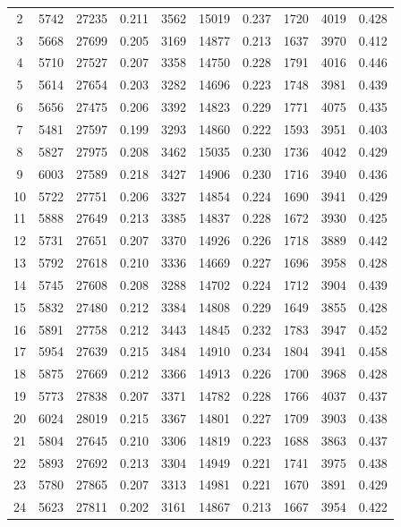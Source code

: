 \begin{table}
\begin{tabular}{c|C{1cm}C{1cm}C{1cm}|C{1cm}C{1cm}C{1cm}|C{1cm}C{1cm}C{1cm}}
 2 & 5742 & 27235 & 0.211 & 3562 & 15019 & 0.237 & 1720 & 4019 & 0.428 \\
 3 & 5668 & 27699 & 0.205 & 3169 & 14877 & 0.213 & 1637 & 3970 & 0.412 \\
 4 & 5710 & 27527 & 0.207 & 3358 & 14750 & 0.228 & 1791 & 4016 & 0.446 \\
 5 & 5614 & 27654 & 0.203 & 3282 & 14696 & 0.223 & 1748 & 3981 & 0.439 \\
 6 & 5656 & 27475 & 0.206 & 3392 & 14823 & 0.229 & 1771 & 4075 & 0.435 \\
 7 & 5481 & 27597 & 0.199 & 3293 & 14860 & 0.222 & 1593 & 3951 & 0.403 \\
 8 & 5827 & 27975 & 0.208 & 3462 & 15035 & 0.230 & 1736 & 4042 & 0.429 \\
 9 & 6003 & 27589 & 0.218 & 3427 & 14906 & 0.230 & 1716 & 3940 & 0.436 \\
10 & 5722 & 27751 & 0.206 & 3327 & 14854 & 0.224 & 1690 & 3941 & 0.429 \\
11 & 5888 & 27649 & 0.213 & 3385 & 14837 & 0.228 & 1672 & 3930 & 0.425 \\
12 & 5731 & 27651 & 0.207 & 3370 & 14926 & 0.226 & 1718 & 3889 & 0.442 \\
13 & 5792 & 27618 & 0.210 & 3336 & 14669 & 0.227 & 1696 & 3958 & 0.428 \\
14 & 5745 & 27608 & 0.208 & 3288 & 14702 & 0.224 & 1712 & 3904 & 0.439 \\
15 & 5832 & 27480 & 0.212 & 3384 & 14808 & 0.229 & 1649 & 3855 & 0.428 \\
16 & 5891 & 27758 & 0.212 & 3443 & 14845 & 0.232 & 1783 & 3947 & 0.452 \\
17 & 5954 & 27639 & 0.215 & 3484 & 14910 & 0.234 & 1804 & 3941 & 0.458 \\
18 & 5875 & 27669 & 0.212 & 3366 & 14913 & 0.226 & 1700 & 3968 & 0.428 \\
19 & 5773 & 27838 & 0.207 & 3371 & 14782 & 0.228 & 1766 & 4037 & 0.437 \\
20 & 6024 & 28019 & 0.215 & 3367 & 14801 & 0.227 & 1709 & 3903 & 0.438 \\
21 & 5804 & 27645 & 0.210 & 3306 & 14819 & 0.223 & 1688 & 3863 & 0.437 \\
22 & 5893 & 27692 & 0.213 & 3304 & 14949 & 0.221 & 1741 & 3975 & 0.438 \\
23 & 5780 & 27865 & 0.207 & 3313 & 14981 & 0.221 & 1670 & 3891 & 0.429 \\
24 & 5623 & 27811 & 0.202 & 3161 & 14867 & 0.213 & 1667 & 3954 & 0.422 \\

\end{tabular}
\end{table}
